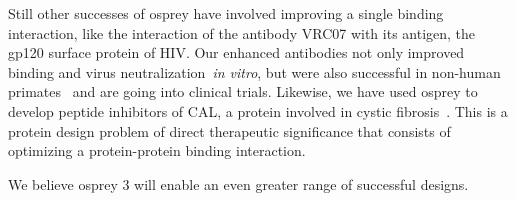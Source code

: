 Still other successes of {\sc osprey} have involved improving a single binding interaction, like the interaction of the antibody VRC07 with its antigen, the gp120 surface protein of HIV.  Our enhanced antibodies not only improved binding and virus neutralization~\textit{in vitro}, but were also successful in non-human primates~\cite{VRC07_enhance} and are going into clinical trials.  Likewise, we have used {\sc osprey} to develop peptide inhibitors of CAL, a protein involved in cystic fibrosis~\cite{CFTR}.  This is a protein design problem of direct therapeutic significance that consists of optimizing a protein-protein binding interaction.  

We believe {\sc osprey} 3 will enable an even greater range of successful designs.  
